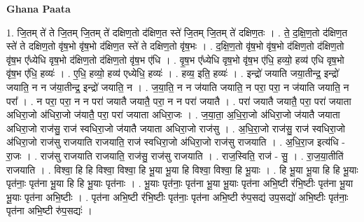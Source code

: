 \documentclass[17pt]{extarticle}
\begin{document}
\textbf{Ghana Paata } \newline

1. जि॒तम् ते॑ ते जि॒तम् जि॒तम् ते॑ दक्षिण॒तो द॑क्षिण॒त स्ते॑ जि॒तम् जि॒तम् ते॑ दक्षिण॒तः । . ते॒ द॒क्षि॒ण॒तो द॑क्षिण॒त स्ते॑ ते दक्षिण॒तो वृ॑ष॒भो वृ॑ष॒भो द॑क्षिण॒त स्ते॑ ते दक्षिण॒तो वृ॑ष॒भः । . द॒क्षि॒ण॒तो वृ॑ष॒भो वृ॑ष॒भो द॑क्षिण॒तो द॑क्षिण॒तो वृ॑ष॒भ ए᳚ध्येधि वृष॒भो द॑क्षिण॒तो द॑क्षिण॒तो वृ॑ष॒भ ए॑धि । . वृ॒ष॒भ ए᳚ध्येधि वृष॒भो वृ॑ष॒भ ए॑धि॒ हव्यो॒ हव्य॑ एधि वृष॒भो वृ॑ष॒भ ए॑धि॒ हव्यः॑ । . ए॒धि॒ हव्यो॒ हव्य॑ एध्येधि॒ हव्यः॑ । . हव्य॒ इति॒ हव्यः॑ । . इन्द्रो॑ जयाति जया॒तीन्द्र॒ इन्द्रो॑ जयाति॒ न न ज॑या॒तीन्द्र॒ इन्द्रो॑ जयाति॒ न । . ज॒या॒ति॒ न न ज॑याति जयाति॒ न परा॒ परा॒ न ज॑याति जयाति॒ न परा᳚ । . न परा॒ परा॒ न न परा॑ जयातै जयातै॒ परा॒ न न परा॑ जयातै । . परा॑ जयातै जयातै॒ परा॒ परा॑ जयाता अधिरा॒जो अ॑धिरा॒जो ज॑यातै॒ परा॒ परा॑ जयाता अधिरा॒जः । . ज॒या॒ता॒ अ॒धि॒रा॒जो अ॑धिरा॒जो ज॑यातै जयाता अधिरा॒जो राज॑सु॒ राज॑ स्वधिरा॒जो ज॑यातै जयाता अधिरा॒जो राज॑सु । . अ॒धि॒रा॒जो राज॑सु॒ राज॑ स्वधिरा॒जो अ॑धिरा॒जो राज॑सु राजयाति राजयाति॒ राज॑ स्वधिरा॒जो अ॑धिरा॒जो राज॑सु राजयाति । . अ॒धि॒रा॒ज इत्य॑धि - रा॒जः । . राज॑सु राजयाति राजयाति॒ राज॑सु॒ राज॑सु राजयाति । . राज॒स्विति॒ राज॑ - सु॒ । . रा॒ज॒या॒तीति॑ राजयाति । . विश्वा॒ हि हि विश्वा॒ विश्वा॒ हि भू॒या भू॒या हि विश्वा॒ विश्वा॒ हि भू॒याः । . हि भू॒या भू॒या हि हि भू॒याः पृत॑नाः॒ पृत॑ना भू॒या हि हि भू॒याः पृत॑नाः । . भू॒याः पृत॑नाः॒ पृत॑ना भू॒या भू॒याः पृत॑ना अभि॒ष्टी र॑भि॒ष्टीः पृत॑ना भू॒या भू॒याः पृत॑ना अभि॒ष्टीः । . पृत॑ना अभि॒ष्टी र॑भि॒ष्टीः पृत॑नाः॒ पृत॑ना अभि॒ष्टी रु॑प॒सद्य॑ उप॒सद्यो॑ अभि॒ष्टीः पृत॑नाः॒ पृत॑ना अभि॒ष्टी रु॑प॒सद्यः॑ । \newline
\end{document}
